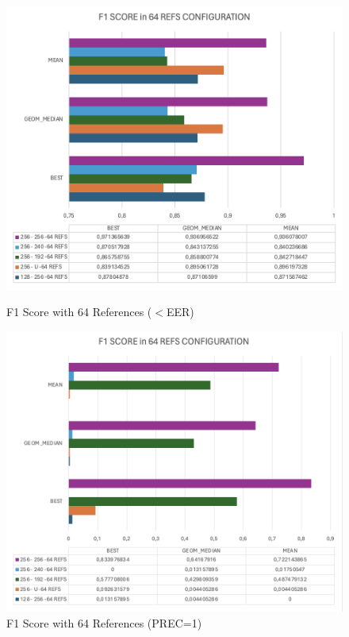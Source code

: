 \begin{figure}[!h]
    \begin{minipage}[b]{0.5\textwidth}
            \centering
            \includegraphics[width=\textwidth]{images/5.07 F1 Score 64 DNN.png}
            \caption{F1 Score with 64 References ($<$EER)}
            \label{fig:f1 score in configurations with 64 refs dnn}
    \end{minipage}
    \hfill
    \begin{minipage}[b]{0.5\textwidth}
            \centering
            \includegraphics[width=\textwidth]{images/5.08 F1 Score 64 DNN prec1.png}
            \caption{F1 Score with 64 References (PREC=1)}
            \label{fig:f1 score in configurations with 64 refs (prec=1) dnn}
    \end{minipage}
\end{figure}
\newpage
